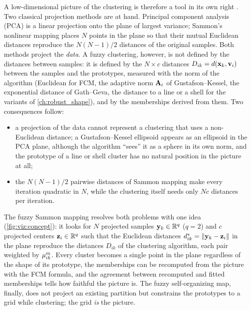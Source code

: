 A low-dimensional picture of the clustering is therefore a tool in its own right \cite{kovacs:2002:fuzzsam,abonyi:2004:fuzzsam,feil:2007:fuzzsam}. Two classical projection methods are at hand. Principal component analysis (PCA) is a linear projection onto the plane of largest variance; Sammon's nonlinear mapping \cite{sammon:1969} places $N$ points in the plane so that their mutual Euclidean distances reproduce the $N(N-1)/2$ distances of the original samples. Both methods project the \emph{data}. A fuzzy clustering, however, is not defined by the distances between samples: it is defined by the $N\times c$ distances $D_{ik}=d(\mathbf{x}_k,\mathbf{v}_i)$ between the samples and the prototypes, measured with the norm of the algorithm (Euclidean for FCM, the adaptive norm $\mathbf{A}_i$ of Gustafson--Kessel, the exponential distance of Gath--Geva, the distance to a line or a shell for the variants of \cref{ch:robust_shape}), and by the memberships derived from them. Two consequences follow:
\begin{itemize}
  \item a projection of the data cannot represent a clustering that uses a non-Euclidean distance; a Gustafson--Kessel ellipsoid appears as an ellipsoid in the PCA plane, although the algorithm ``sees'' it as a sphere in its own norm, and the prototype of a line or shell cluster has no natural position in the picture at all;
  \item the $N(N-1)/2$ pairwise distances of Sammon mapping make every iteration quadratic in $N$, while the clustering itself needs only $Nc$ distances per iteration.
\end{itemize}

The fuzzy Sammon mapping resolves both problems with one idea (\cref{fig:viz:concept}): it looks for $N$ projected samples $\mathbf{y}_k\in\mathbb{R}^q$ ($q=2$) and $c$ projected centers $\mathbf{z}_i\in\mathbb{R}^q$ such that the Euclidean distances $d^*_{ik}=\left\lVert \mathbf{y}_k-\mathbf{z}_i \right\rVert$ in the plane reproduce the distances $D_{ik}$ of the clustering algorithm, each pair weighted by $\mu_{ik}^m$. Every cluster becomes a single point in the plane regardless of the shape of its prototype, the memberships can be recomputed from the picture with the FCM formula, and the agreement between recomputed and fitted memberships tells how faithful the picture is. The fuzzy self-organizing map, finally, does not project an existing partition but constrains the prototypes to a grid while clustering; the grid \emph{is} the picture.

